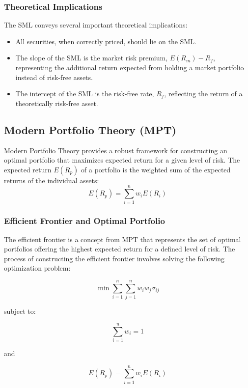 \subsubsection{Theoretical Implications}
The SML conveys several important theoretical implications:
\begin{itemize}
    \item All securities, when correctly priced, should lie on the SML.
    \item The slope of the SML is the market risk premium, $E(R_m) - R_f$, representing the additional return expected from holding a market portfolio instead of risk-free assets.
    \item The intercept of the SML is the risk-free rate, $R_f$, reflecting the return of a theoretically risk-free asset.
\end{itemize}

\subsection{Modern Portfolio Theory (MPT)}
Modern Portfolio Theory provides a robust framework for constructing an optimal portfolio that maximizes expected return for a given level of risk. The expected return $E(R_p)$ of a portfolio is the weighted sum of the expected returns of the individual assets:
\begin{equation}
E(R_p) = \sum_{i=1}^n w_iE(R_i)
\end{equation}

\subsubsection{Efficient Frontier and Optimal Portfolio}
The efficient frontier is a concept from MPT that represents the set of optimal portfolios offering the highest expected return for a defined level of risk. The process of constructing the efficient frontier involves solving the following optimization problem:

\begin{equation}
\min \sum_{i=1}^n \sum_{j=1}^n w_i w_j \sigma_{ij}
\end{equation}

subject to:

\begin{equation}
\sum_{i=1}^n w_i = 1
\end{equation}

and

\begin{equation}
E(R_p) = \sum_{i=1}^n w_iE(R_i)
\end{equation}

